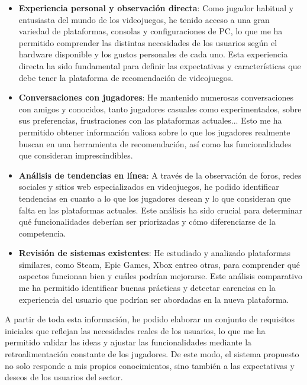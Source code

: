 \begin{itemize}
    \item \textbf{Experiencia personal y observación directa}: Como jugador habitual y entusiasta del mundo de los videojuegos, he tenido acceso a una gran variedad de plataformas, consolas y configuraciones de PC, lo que me ha permitido comprender las distintas necesidades de los usuarios según el hardware disponible y los gustos personales de cada uno. Esta experiencia directa ha sido fundamental para definir las expectativas y características que debe tener la plataforma de recomendación de videojuegos.

    \item \textbf{Conversaciones con jugadores}: He mantenido numerosas conversaciones con amigos y conocidos, tanto jugadores casuales como experimentados, sobre sus preferencias, frustraciones con las plataformas actuales... Esto me ha permitido obtener información valiosa sobre lo que los jugadores realmente buscan en una herramienta de recomendación, así como las funcionalidades que consideran imprescindibles.

    \item \textbf{Análisis de tendencias en línea}: A través de la observación de foros, redes sociales y sitios web especializados en videojuegos, he podido identificar  tendencias en cuanto a lo que los jugadores desean y lo que consideran que falta en las plataformas actuales. Este análisis ha sido crucial para determinar qué funcionalidades deberían ser priorizadas y cómo diferenciarse de la competencia.

    \item \textbf{Revisión de sistemas existentes}: He estudiado y analizado plataformas similares, como Steam, Epic Games, Xbox entreo otras, para comprender qué aspectos funcionan bien y cuáles podrían mejorarse. Este análisis comparativo me ha permitido identificar buenas prácticas y detectar carencias en la experiencia del usuario que podrían ser abordadas en la nueva plataforma.

\end{itemize}

A partir de toda esta información, he podido elaborar un conjunto de requisitos iniciales que reflejan las necesidades reales de los usuarios, lo que me ha permitido validar las ideas y ajustar las funcionalidades mediante la retroalimentación constante de los jugadores. De este modo, el sistema propuesto no solo responde a mis propios conocimientos, sino también a las expectativas y deseos de los usuarios del sector.

